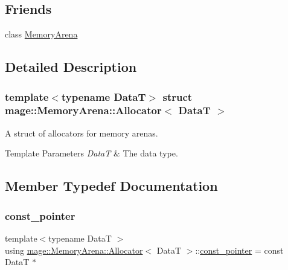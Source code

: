 \subsection*{Friends}
\begin{DoxyCompactItemize}
\item 
class \hyperlink{structmage_1_1_memory_arena_1_1_allocator_a934e79307a45b6e72da26d1f10079550}{Memory\+Arena}
\end{DoxyCompactItemize}


\subsection{Detailed Description}
\subsubsection*{template$<$typename DataT$>$\newline
struct mage\+::\+Memory\+Arena\+::\+Allocator$<$ Data\+T $>$}

A struct of allocators for memory arenas.


\begin{DoxyTemplParams}{Template Parameters}
{\em DataT} & The data type. \\
\hline
\end{DoxyTemplParams}


\subsection{Member Typedef Documentation}
\hypertarget{structmage_1_1_memory_arena_1_1_allocator_a3b15a7f2d3fd22fb2626b335f15d5e17}{}\label{structmage_1_1_memory_arena_1_1_allocator_a3b15a7f2d3fd22fb2626b335f15d5e17} 
\subsubsection{\texorpdfstring{const\+\_\+pointer}{const\_pointer}}
{\footnotesize\ttfamily template$<$typename DataT $>$ \\
using \hyperlink{structmage_1_1_memory_arena_1_1_allocator}{mage\+::\+Memory\+Arena\+::\+Allocator}$<$ DataT $>$\+::\hyperlink{structmage_1_1_memory_arena_1_1_allocator_a3b15a7f2d3fd22fb2626b335f15d5e17}{const\+\_\+pointer} =  const DataT $\ast$}

